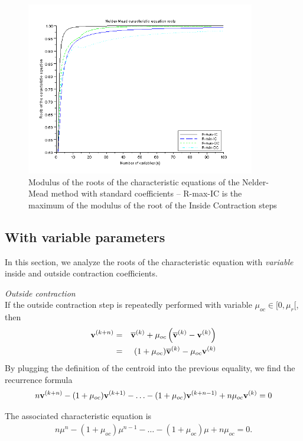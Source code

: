 \begin{figure}
\begin{center}
\includegraphics[width=10cm]{neldermeadmethod/neldermead-roots.png}
\end{center}
\caption{Modulus of the roots of the characteristic equations of the Nelder-Mead method with standard 
coefficients -- R-max-IC is the maximum of the modulus of the root of the Inside Contraction steps}
\label{fig-nm-roots}
\end{figure}

\subsection{With variable parameters}

In this section, we analyze the roots of the characteristic 
equation with \emph{variable} inside and outside contraction
coefficients.

\emph{Outside contraction} \\
If the outside contraction step is repeatedly performed
with variable $\mu_{oc} \in [0,\mu_r[$, then 
\begin{eqnarray}
\mathbf{v}^{(k+n)} &=& \overline{\bold{v}}^{(k)} 
+ \mu_{oc} \left( \overline{\bold{v}}^{(k)} - \mathbf{v}^{(k)}\right) \\
&=& (1 + \mu_{oc} ) \overline{\bold{v}}^{(k)} - \mu_{oc} \mathbf{v}^{(k)}
\end{eqnarray}
By plugging the definition of the centroid into the previous equality, we 
find the recurrence formula
\begin{eqnarray}
n \mathbf{v}^{(k+n)} - (1 + \mu_{oc} ) \mathbf{v}^{(k+1)} - \ldots - (1 + \mu_{oc} ) \mathbf{v}^{(k+n-1)} + n\mu_{oc}\mathbf{v}^{(k)} = 0
\end{eqnarray}

The associated characteristic equation is 
\begin{eqnarray}
\label{recurrence-variable}
n \mu^n - (1 + \mu_{oc} ) \mu^{n-1} - \ldots - (1 + \mu_{oc} ) \mu + n \mu_{oc} = 0.
\end{eqnarray}

